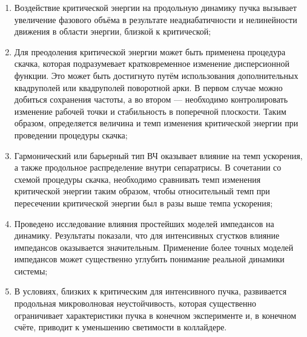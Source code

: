 \begin{enumerate}

\item Воздействие критической энергии на продольную динамику пучка вызывает увеличение фазового объёма в результате неадиабатичности и нелинейности движения в области энергии, близкой к критической;

\item Для преодоления критической энергии может быть применена процедура скачка, которая подразумевает кратковременное изменение дисперсионной функции. Это может быть достигнуто путём использования дополнительных квадруполей или квадруполей поворотной арки. В первом случае можно добиться сохранения частоты, а во втором — необходимо контролировать изменение рабочей точки и стабильность в поперечной плоскости. Таким образом, определяется величина и темп изменения критической энергии при проведении процедуры скачка;

\item Гармонический или барьерный тип ВЧ оказывает влияние на темп ускорения, а также продольное распределение внутри сепаратрисы. В сочетании со схемой процедуры скачка, необходимо сравнивать темп изменения критической энергии таким образом, чтобы относительный темп при пересечении критической энергии был в разы выше темпа ускорения;

\item Проведено исследование влияния простейших моделей импедансов на динамику. Результаты показали, что для интенсивных сгустков влияние импедансов оказывается значительным. Применение более точных моделей импедансов может существенно углубить понимание реальной динамики системы;

\item В условиях, близких к критическим для интенсивного пучка, развивается продольная микроволновая неустойчивость, которая существенно ограничивает характеристики пучка в конечном эксперименте и, в конечном счёте, приводит к уменьшению светимости в коллайдере.

\end{enumerate}


\FloatBarrier
